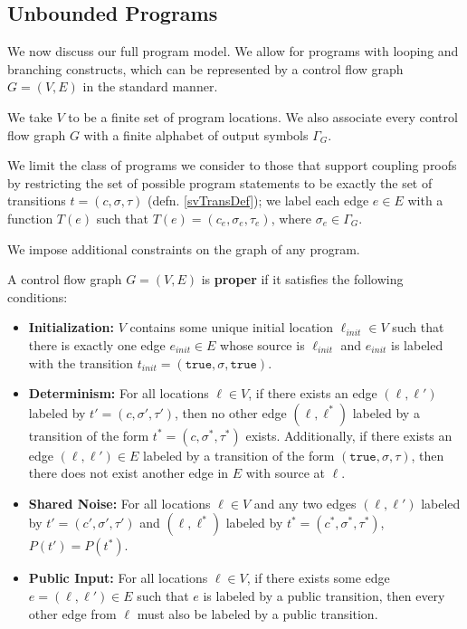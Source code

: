 
\subsection{Unbounded Programs}

We now discuss our full program model. We allow for programs with looping and branching constructs, which can be represented by a control flow graph $G = (V, E)$ in the standard manner. 

We take $V$ to be a finite set of program locations. We also associate every control flow graph $G$ with a finite alphabet of output symbols $\Gamma_G$.

We limit the class of programs we consider to those that support coupling proofs by restricting the set of possible program statements to be exactly the set of transitions $t = (c, \sigma, \tau)$ (defn. \ref{svTransDef}); we label each edge $e\in E$ with a function $T(e)$ such that $T(e) = (c_e, \sigma_e, \tau_e)$, where $\sigma_e \in \Gamma_G$. 

We impose additional constraints on the graph of any program. 

\begin{defn}
    A control flow graph $G = (V, E)$ is \textbf{proper} if it satisfies the following conditions: 
    \begin{itemize}
        \item \textbf{Initialization:} $V$ contains some unique initial location $\ell_{init}\in V$ such that there is exactly one edge $e_{init}\in E$ whose source is $\ell_{init}$ and $e_{init}$ is labeled with the transition $t_{init} = (\texttt{true}, \sigma, \texttt{true})$.
        \item \textbf{Determinism:} For all locations $\ell\in V$, if there exists an edge $(\ell, \ell')$ labeled by $t'=(c, \sigma', \tau')$, then no other edge $(\ell, \ell^*)$ labeled by a transition of the form $t^* = (c, \sigma^*, \tau^*)$ exists. 
        Additionally, if there exists an edge $(\ell, \ell')\in E$ labeled by a transition of the form $(\texttt{true}, \sigma, \tau)$, then there does not exist another edge in $E$ with source at $\ell$.
        \item \textbf{Shared Noise:} For all locations $\ell\in V$ and any two edges $(\ell, \ell')$ labeled by $t'=(c', \sigma', \tau')$ and $(\ell, \ell^*)$ labeled by $t^* = (c^*, \sigma^*, \tau^*)$, $P(t') = P(t^*)$. 
        \item \textbf{Public Input:} For all locations $\ell\in V$, if there exists some edge $e = (\ell, \ell') \in E$ such that $e$ is labeled by a public transition, then every other edge from $\ell$ must also be labeled by a public transition. 
\end{itemize}
\end{defn}


